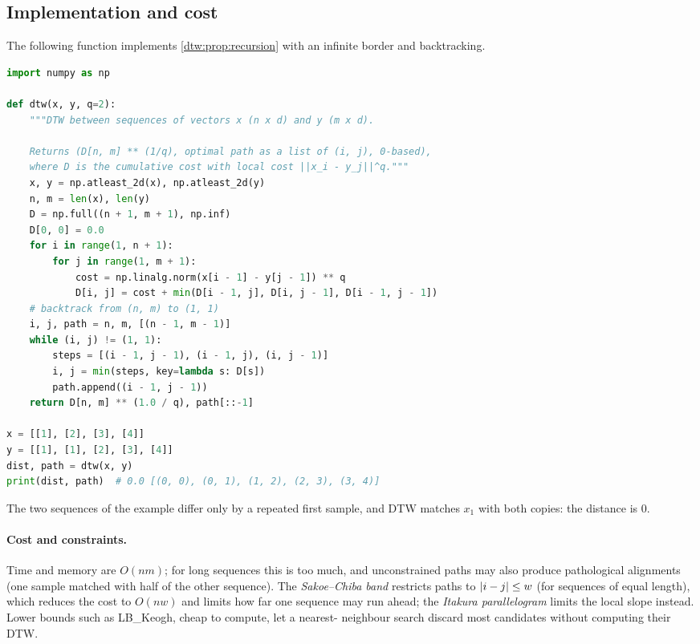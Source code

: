 \begin{notechapter}
\section{Implementation and cost}\label{dtw:sec:implementation}

The following function implements \cref{dtw:prop:recursion} with an infinite border and
backtracking.

\begin{lstlisting}[language=Python]
import numpy as np

def dtw(x, y, q=2):
    """DTW between sequences of vectors x (n x d) and y (m x d).

    Returns (D[n, m] ** (1/q), optimal path as a list of (i, j), 0-based),
    where D is the cumulative cost with local cost ||x_i - y_j||^q."""
    x, y = np.atleast_2d(x), np.atleast_2d(y)
    n, m = len(x), len(y)
    D = np.full((n + 1, m + 1), np.inf)
    D[0, 0] = 0.0
    for i in range(1, n + 1):
        for j in range(1, m + 1):
            cost = np.linalg.norm(x[i - 1] - y[j - 1]) ** q
            D[i, j] = cost + min(D[i - 1, j], D[i, j - 1], D[i - 1, j - 1])
    # backtrack from (n, m) to (1, 1)
    i, j, path = n, m, [(n - 1, m - 1)]
    while (i, j) != (1, 1):
        steps = [(i - 1, j - 1), (i - 1, j), (i, j - 1)]
        i, j = min(steps, key=lambda s: D[s])
        path.append((i - 1, j - 1))
    return D[n, m] ** (1.0 / q), path[::-1]

x = [[1], [2], [3], [4]]
y = [[1], [1], [2], [3], [4]]
dist, path = dtw(x, y)
print(dist, path)  # 0.0 [(0, 0), (0, 1), (1, 2), (2, 3), (3, 4)]
\end{lstlisting}

The two sequences of the example differ only by a repeated first sample, and DTW
matches $x_1$ with both copies: the distance is $0$.

\paragraph{Cost and constraints.} Time and memory are $O(nm)$; for long sequences this is
too much, and unconstrained paths may also produce pathological alignments (one
sample matched with half of the other sequence). The \emph{Sakoe--Chiba band} restricts
paths to $\left|i - j\right|\leq w$ (for sequences of equal length), which reduces the cost to $O(nw)$ and
limits how far one sequence may run ahead; the \emph{Itakura parallelogram} limits the
local slope instead. Lower bounds such as LB\_Keogh, cheap to compute, let a nearest-
neighbour search discard most candidates without computing their DTW.


\end{notechapter}
